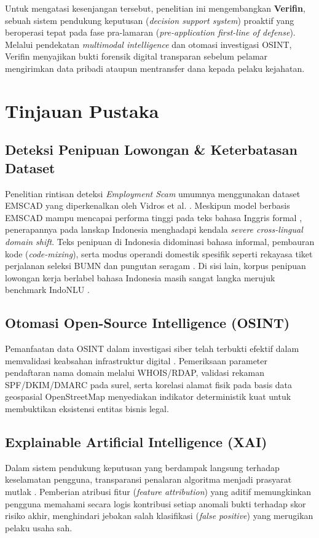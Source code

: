 \documentclass[conference]{IEEEtran}
\begin{document}
Untuk mengatasi kesenjangan tersebut, penelitian ini mengembangkan \textbf{Verifin}, sebuah sistem pendukung keputusan (\textit{decision support system}) proaktif yang beroperasi tepat pada fase pra-lamaran (\textit{pre-application first-line of defense}). Melalui pendekatan \textit{multimodal intelligence} dan otomasi investigasi OSINT, Verifin menyajikan bukti forensik digital transparan sebelum pelamar mengirimkan data pribadi ataupun mentransfer dana kepada pelaku kejahatan.

\section{Tinjauan Pustaka}

\subsection{Deteksi Penipuan Lowongan \& Keterbatasan Dataset}
Penelitian rintisan deteksi \textit{Employment Scam} umumnya menggunakan dataset EMSCAD yang diperkenalkan oleh Vidros et al. \cite{vidros2017}. Meskipun model berbasis EMSCAD mampu mencapai performa tinggi pada teks bahasa Inggris formal \cite{amaar2022}, penerapannya pada lanskap Indonesia menghadapi kendala \textit{severe cross-lingual domain shift}. Teks penipuan di Indonesia didominasi bahasa informal, pembauran kode (\textit{code-mixing}), serta modus operandi domestik spesifik seperti rekayasa tiket perjalanan seleksi BUMN dan pungutan seragam \cite{pratama2026}. Di sisi lain, korpus penipuan lowongan kerja berlabel bahasa Indonesia masih sangat langka merujuk benchmark IndoNLU \cite{wilie2020}.

\subsection{Otomasi Open-Source Intelligence (OSINT)}
Pemanfaatan data OSINT dalam investigasi siber telah terbukti efektif dalam memvalidasi keabsahan infrastruktur digital \cite{pastor2020}. Pemeriksaan parameter pendaftaran nama domain melalui WHOIS/RDAP, validasi rekaman SPF/DKIM/DMARC pada surel, serta korelasi alamat fisik pada basis data geospasial OpenStreetMap menyediakan indikator deterministik kuat untuk membuktikan eksistensi entitas bisnis legal.

\subsection{Explainable Artificial Intelligence (XAI)}
Dalam sistem pendukung keputusan yang berdampak langsung terhadap keselamatan pengguna, transparansi penalaran algoritma menjadi prasyarat mutlak \cite{lundberg2017}. Pemberian atribusi fitur (\textit{feature attribution}) yang aditif memungkinkan pengguna memahami secara logis kontribusi setiap anomali bukti terhadap skor risiko akhir, menghindari jebakan salah klasifikasi (\textit{false positive}) yang merugikan pelaku usaha sah.
\end{document}
